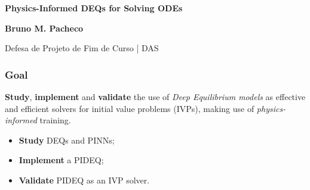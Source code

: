 \documentclass[t]{beamer}
\begin{document}
{
\begin{frame}
\vspace{18mm}
\begin{flushright}
\textcolor{cinza}{\textbf{\Large{
Physics-Informed DEQs for Solving ODEs
}}}
\end{flushright}

\vspace{-6mm}
\begin{flushright}
\textcolor{cinza}{\textbf{\scriptsize{
Bruno M. Pacheco
}}}
\end{flushright}

\vspace{-7mm}
\begin{flushright}
\textcolor{cinza}{\scriptsize{
Defesa de Projeto de Fim de Curso | DAS
}}
\end{flushright}


\end{frame}
}


\begin{frame}
\frametitle{Goal}
\textbf{Study}, \textbf{implement} and \textbf{validate} the use of \emph{Deep Equilibrium models} as effective and efficient solvers for initial value problems (IVPs), making use of \emph{physics-informed} training.

\begin{itemize}
    \item<2-> \textbf{Study} DEQs and PINNs;
    \item<3-> \textbf{Implement} a PIDEQ;
    \item<4-> \textbf{Validate} PIDEQ as an IVP solver.
\end{itemize}
\end{frame}
\end{document}
